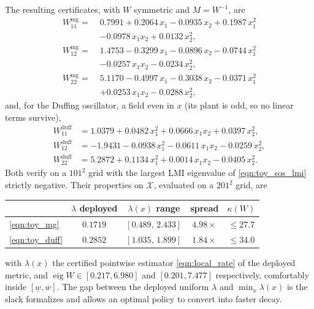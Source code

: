 \documentclass[lettersize,journal]{IEEEtran}
\begin{document}
The resulting certificates, with $W$ symmetric and $M = W^{-1}$, are
\begin{align*}
W^{\mathrm{mg}}_{11} =\;& 0.7991 + 0.2064\,x_1 - 0.0935\,x_2 + 0.1987\,x_1^2 \\
 & - 0.0978\,x_1x_2 + 0.0132\,x_2^2, \\
W^{\mathrm{mg}}_{12} =\;& 1.4753 - 0.3299\,x_1 - 0.0896\,x_2 - 0.0744\,x_1^2 \\
 & - 0.0257\,x_1x_2 - 0.0234\,x_2^2, \\
W^{\mathrm{mg}}_{22} =\;& 5.1170 - 0.4997\,x_1 - 0.3038\,x_2 - 0.0371\,x_1^2 \\
 & + 0.0253\,x_1x_2 - 0.0288\,x_2^2,
\end{align*}
and, for the Duffing oscillator, a field even in $x$ (its plant is odd, so no
linear terms survive),
\begin{align*}
W^{\mathrm{duff}}_{11} &= 1.0379 + 0.0482\,x_1^2 + 0.0666\,x_1x_2 + 0.0397\,x_2^2, \\
W^{\mathrm{duff}}_{12} &= -1.9431 - 0.0938\,x_1^2 - 0.0611\,x_1x_2 - 0.0259\,x_2^2, \\
W^{\mathrm{duff}}_{22} &= 5.2872 + 0.1134\,x_1^2 + 0.0014\,x_1x_2 - 0.0405\,x_2^2 .
\end{align*}
Both verify on a $101^2$ grid with the largest LMI eigenvalue of
\eqref{eqn:toy_sos_lmi} strictly negative. Their properties on
$\mathcal{X}$, evaluated on a $201^2$ grid, are
\begin{center}
\begin{tabular}{lcccc}
\toprule
 & $\lambda$ deployed & $\lambda(x)$ range & spread & $\kappa(W)$ \\
\midrule
\eqref{eqn:toy_mg}   & $0.1719$ & $[0.489,\,2.433]$ & $4.98\times$ & $\le 27.7$ \\
\eqref{eqn:toy_duff} & $0.2852$ & $[1.035,\,1.899]$ & $1.84\times$ & $\le 34.0$ \\
\bottomrule
\end{tabular}
\end{center}
with $\lambda(x)$ the certified pointwise estimator \eqref{eqn:local_rate} of
the deployed metric, and $\operatorname{eig}W \in [0.217, 6.980]$ and
$[0.201, 7.477]$ respectively, comfortably inside
$[\underline{w}, \overline{w}]$. The gap between the deployed uniform
$\lambda$ and $\min_x \lambda(x)$ is the slack  formalizes
and  allows an optimal policy to convert into
faster decay.
\end{document}
